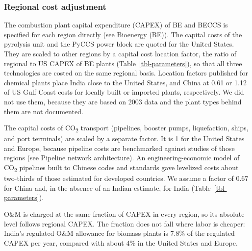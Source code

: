 \documentclass[
  letterpaper,
  twoside,
  twocolumn,
  9pt]{article}
\begin{document}
\subsubsection{Regional cost adjustment}\label{regional-cost-adjustment}

The combustion plant capital expenditure (CAPEX) of BE and BECCS is
specified for each region directly (see Bioenergy (BE)). The capital
costs of the pyrolysis unit and the PyCCS power block are quoted for the
United States. They are scaled to other regions by a capital cost
location factor, the ratio of regional to US CAPEX of BE plants
(Table~\ref{tbl-parameters}), so that all three technologies are costed
on the same regional basis. Location factors published for chemical
plants place India close to the United States, and China at 0.61 or 1.12
of US Gulf Coast costs for locally built or imported plants,
respectively.\citep{towler2022} We did not use them, because they are
based on 2003 data and the plant types behind them are not documented.

The capital costs of CO\textsubscript{2} transport (pipelines, booster
pumps, liquefaction, ships, and port terminals) are scaled by a separate
factor. It is 1 for the United States and Europe, because pipeline costs
are benchmarked against studies of those regions (see Pipeline network
architecture). An engineering-economic model of CO\textsubscript{2}
pipelines built to Chinese codes and standards gave levelized costs
about two-thirds of those estimated for developed
countries.\citep{liu2011pipeline} We assume a factor of 0.67 for China
and, in the absence of an Indian estimate, for India
(Table~\ref{tbl-parameters}).

O\&M is charged at the same fraction of CAPEX in every region, so its
absolute level follows regional CAPEX. The fraction does not fall where
labor is cheaper: India's regulated O\&M allowance for biomass plants is
7.8\% of the regulated CAPEX per year,\citep{cerc2024} compared with
about 4\% in the United States and Europe.\citep{eia2026, dea2020}
\end{document}
